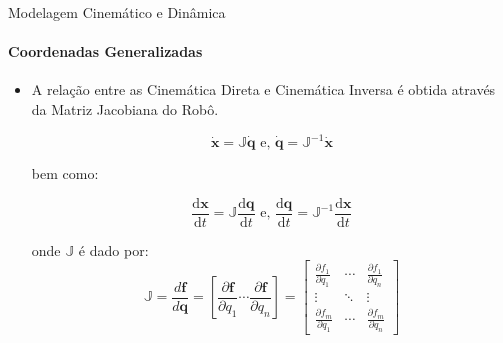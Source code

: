 \documentclass{beamer}
\begin{document}
\begin{frame}{Modelagem Cinemático e Dinâmica}
    \framesubtitle{Coordenadas Generalizadas}
    \begin{itemize}
        \item A relação entre as Cinemática Direta e Cinemática Inversa é obtida através da Matriz Jacobiana do Robô.

              \begin{equation*}
                  \mathbf{\dot{x}} = \mathbb{J}{\mathbf{\dot{q}}}
                  \text{ e, }
                  \mathbf{\dot{q}} = \mathbb{J}^{-1}{\mathbf{\dot{x}}}
              \end{equation*}

              bem como:

              \begin{equation*}
                  \frac{\text{d}\mathbf{x}}{\text{d}t} = \mathbb{J}\frac{\text{d}\mathbf{q}}{\text{d}t}
                  \text{ e, }
                  \frac{\text{d}\mathbf{q}}{\text{d}t} = \mathbb{J}^{-1}\frac{\text{d}\mathbf{x}}{\text{d}t}
              \end{equation*}

              onde $\mathbb{J}$ é dado por:
              \begin{equation*}
                  \mathbb{J}
                  =
                  \frac{d \mathbf{f}}{d \mathbf{q}}
                  =
                  \left[ \frac{\partial \mathbf{f}}{\partial q_1}
                      \cdots \frac{\partial \mathbf{f}}{\partial q_n} \right]
                  =
                  \begin{bmatrix}
                      \frac{\partial f_1}{\partial q_1} & \cdots &
                      \frac{\partial f_1}{\partial q_n}                   \\
                      \vdots                            & \ddots & \vdots \\
                      \frac{\partial f_m}{\partial q_1} & \cdots &
                      \frac{\partial f_m}{\partial q_n}
                  \end{bmatrix}
              \end{equation*}
    \end{itemize}
\end{frame}
\end{document}
